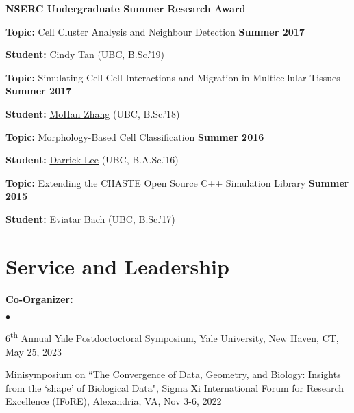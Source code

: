 \documentclass[margin,line]{res}
\newenvironment{list1}{
  \begin{list}{\ding{113}}{
      \setlength{\itemsep}{0in}
      \setlength{\parsep}{0in} \setlength{\parskip}{0in}
      \setlength{\topsep}{0in} \setlength{\partopsep}{0in}
      \setlength{\leftmargin}{0.17in}}}{\end{list}}
\newenvironment{list2}{
  \begin{list}{$\bullet$}{
      \setlength{\itemsep}{0in}
      \setlength{\parsep}{0in} \setlength{\parskip}{0in}
      \setlength{\topsep}{0in} \setlength{\partopsep}{0in}
      \setlength{\leftmargin}{0.2in}}}{\end{list}}
\begin{document}
\begin{resume}
{\bf NSERC Undergraduate Summer Research Award}
\vspace*{.25cm}
\begin{list1}
\setlength\itemsep{0.2em}
\item[] {\bf Topic:} Cell Cluster Analysis and Neighbour Detection \hfill {\bf Summer 2017}
\item[] {\bf Student:} \href{https://ca.linkedin.com/in/csxtan}{Cindy Tan} (UBC, B.Sc.'19) 
\end{list1}
\vspace*{.25cm}
\begin{list1}
\setlength\itemsep{0.2em}
\item[] {\bf Topic:} Simulating Cell-Cell Interactions and Migration in Multicellular Tissues \hfill {\bf Summer 2017}
\item[] {\bf Student:} \href{https://ca.linkedin.com/in/mohan-zhang}{MoHan Zhang} (UBC, B.Sc.'18)
\end{list1}
\vspace*{.25cm}
\begin{list1}
\setlength\itemsep{0.2em}
\item[] {\bf Topic:} Morphology-Based Cell Classification \hfill {\bf Summer 2016}
\item[] {\bf Student:} \href{https://www.math.upenn.edu/~ldarrick/}{Darrick Lee} (UBC, B.A.Sc.'16)
\end{list1}
\vspace*{.25cm}
\begin{list1}
\setlength\itemsep{0.2em}
\item[] {\bf Topic:} Extending the CHASTE Open Source C++ Simulation Library \hfill {\bf Summer 2015}
\item[] {\bf Student:} \href{http://eviatarbach.com/}{Eviatar Bach} (UBC, B.Sc.'17)
\end{list1}

\section{\sc Service and Leadership}

\begin{list1}
\setlength\itemsep{0.5em}

\item[] {\bf Co-Organizer:}
\vspace*{.2cm}
\begin{list2}
\setlength\itemsep{0.5em}
\item[] 6\textsuperscript{th} Annual Yale  Postdoctoctoral Symposium, Yale University, New Haven, CT, May 25, 2023
\item[] Minisymposium on ``The Convergence of Data, Geometry, and Biology: Insights from the `shape' of Biological Data", 
        Sigma Xi International Forum for Research Excellence (IFoRE), Alexandria, VA, Nov 3-6, 2022
\end{list2}


\end{list1}
\end{resume}
\end{document}
